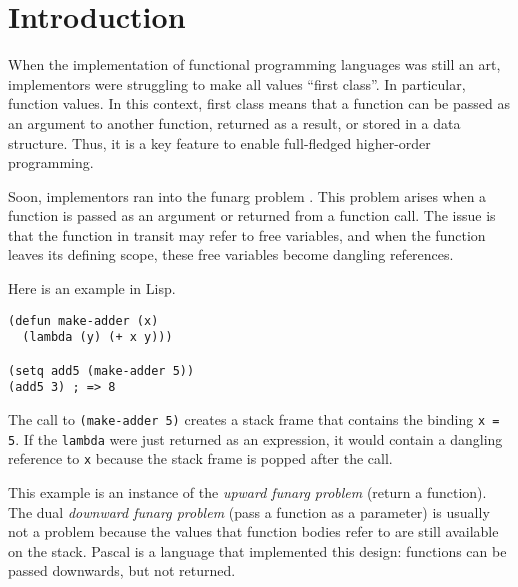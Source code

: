 \documentclass[sigplan,review,dvipsnames,screen,10pt]{acmart}
\begin{document}


\maketitle
\lstset{language=lisp}
\section{Introduction}

When the implementation of functional programming languages was still
an art, implementors were struggling to make all values ``first
class''. In particular, function values. In this context, first
class means that a function can be passed as an argument to another
function, returned as a result, or stored in a data structure. Thus,
it is a key feature to enable full-fledged higher-order programming.

Soon, implementors ran into the funarg problem \cite{moses70:_funct_lisp_funar}. This problem arises
when a function is passed as an argument or returned from a function
call. The issue is that the function in transit may refer to free
variables, and when the function leaves its defining scope, these free
variables become dangling references. 

Here is an example in Lisp.
\begin{lstlisting}
(defun make-adder (x)
  (lambda (y) (+ x y)))

(setq add5 (make-adder 5))
(add5 3) ; => 8
\end{lstlisting}
The call to \lstinline|(make-adder 5)| creates a stack frame that
contains the binding \texttt{x = 5}. If the \lstinline|lambda| were just
returned as an expression, it would contain a dangling reference to
\texttt{x} because the stack frame is popped after the call.

This example is an instance of the \emph{upward funarg problem}
(return a function). The
dual \emph{downward funarg problem} (pass a function as a parameter)
is usually not a problem 
because the values that function bodies refer to are still available
on the stack. Pascal \cite{jensen91:_pascal} is a language that implemented this design:
functions can be passed downwards, but not returned. 
\end{document}
